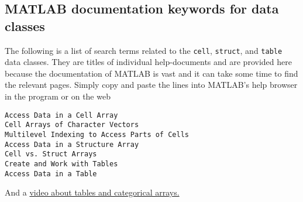 \subsection{MATLAB documentation keywords for data classes}
The following is a list of search terms related to the \lstinline{cell}, \lstinline{struct}, and  \lstinline{table} data classes. They are titles of individual help-documents and are provided here because the documentation of MATLAB is vast and it can take some time to find the relevant pages. Simply copy and paste the lines into MATLAB's help browser in the program or on the web

\begin{verbatim}
Access Data in a Cell Array
Cell Arrays of Character Vectors
Multilevel Indexing to Access Parts of Cells
Access Data in a Structure Array
Cell vs. Struct Arrays
Create and Work with Tables
Access Data in a Table
\end{verbatim}
And a \href{http://ch.mathworks.com/videos/tables-and-categorical-arrays-in-release-2013b-101607.html}{video about tables and categorical arrays.}
